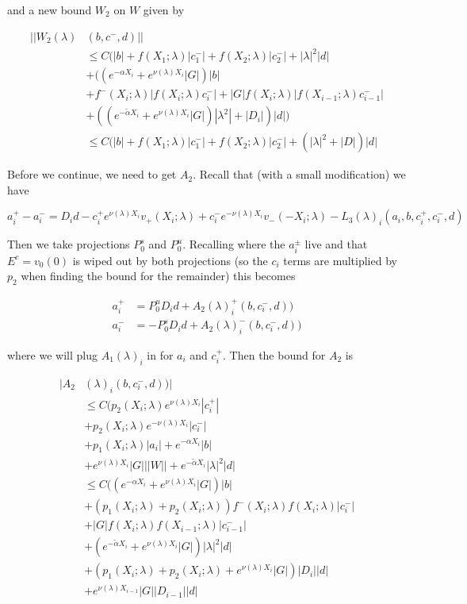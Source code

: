 \documentclass[12pt]{article}
\begin{document}
\begin{enumerate}
and a new bound $W_2$ on $W$ given by

\begin{align*}
||W_2(\lambda)&(b,c^-,d)|| \\
&\leq C (|b| + f(X_1; \lambda)|c_1^-| + f(X_2; \lambda)|c_2^-| + |\lambda|^2 |d| \\
&+ ( (e^{-\alpha X_i} + e^{\nu(\lambda)X_i} |G| )|b| \\
&+ f^-(X_i; \lambda)|f(X_i; \lambda) c_i^-|  + |G| f(X_i; \lambda) |f(X_{i-1}; \lambda) c_{i-1}^-| \\
&+ ((e^{-\tilde{\alpha} X_i} + e^{\nu(\lambda)X_i} |G| ) |\lambda^2| + |D_i|) |d| ) \\
&\leq C (|b| + f(X_1; \lambda)|c_1^-| + f(X_2; \lambda)|c_2^-| + (|\lambda|^2 + |D|)|d|
\end{align*}

Before we continue, we need to get $A_2$. Recall that (with a small modification) we have

\[
a_i^+ - a_i^- = D_i d - c_i^+ e^{\nu(\lambda)X_i} v_+(X_i; \lambda) + c_i^- e^{-\nu(\lambda)X_i} v_-(-X_i; \lambda) - L_3(\lambda)_i(a_i, b, c_i^+, c_i^-, d)
\]

Then we take projections $P^s_0$ and $P^u_0$. Recalling where the $a_i^\pm$ live and that $E^c = v_0(0)$ is wiped out by both projections (so the $c_i$ terms are multiplied by $p_2$ when finding the bound for the remainder) this becomes 

\begin{align*}
a_i^+ &= P^u_0 D_i d + A_2(\lambda)_i^+(b, c_i^-, d))\\
a_i^- &= -P^s_0 D_i d + A_2(\lambda)_i^-(b, c_i^-, d))
\end{align*}

where we will plug $A_1(\lambda)_i$ in for $a_i$ and $c_i^+$. Then the bound for $A_2$ is

\begin{align*}
|A_2&(\lambda)_i(b, c_i^-, d))| \\
&\leq C (p_2(X_i; \lambda) e^{\nu(\lambda)X_i} |c_i^+| \\
&+ p_2(X_i; \lambda) e^{-\nu(\lambda)X_i} |c_i^-| \\
&+ p_1(X_i; \lambda) |a_i| + e^{-\alpha X_i} |b| \\
&+ e^{\nu(\lambda)X_i} |G| ||W|| + e^{-\tilde{\alpha}X_i}|\lambda|^2|d|\\
&\leq C ( (e^{-\alpha X_i} + e^{\nu(\lambda)X_i} |G| )|b| \\
&+ (p_1(X_i; \lambda) + p_2(X_i; \lambda) ) f^-(X_i; \lambda) f(X_i; \lambda) |c_i^-| \\
&+ |G| f(X_i; \lambda) f(X_{i-1}; \lambda) |c_{i-1}^-| \\
&+ (e^{-\tilde{\alpha} X_i} + e^{\nu(\lambda)X_i} |G| )|\lambda|^2 |d| \\
&+ (p_1(X_i; \lambda) + p_2(X_i; \lambda) + e^{\nu(\lambda)X_i} |G|)|D_i||d| \\
&+ e^{\nu(\lambda)X_{i-1}} |G| |D_{i-1}||d|
\end{align*}



\end{enumerate}
\end{document}

